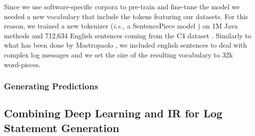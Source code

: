 Since we use software-specific corpora to pre-train and fine-tune the model we needed a new vocabulary that include the \java tokens featuring our datasets. For this reason, we trained a new tokenizer (\emph{i.e.}, a SentencePiece model \cite{kudo2018sentencepiece}) on 1M Java methods and 712,634 English sentences coming from the C4 dataset \cite{raffel2019exploring}. Similarly to what has been done by Mastropaolo \etal \cite{mastropaolo2022using}, we included english sentences to deal with complex log messages and we set the size of the resulting vocabulary to 32k word-pieces.


\subsubsection{Generating Predictions}



\subsection{Combining Deep Learning and IR for Log Statement Generation}